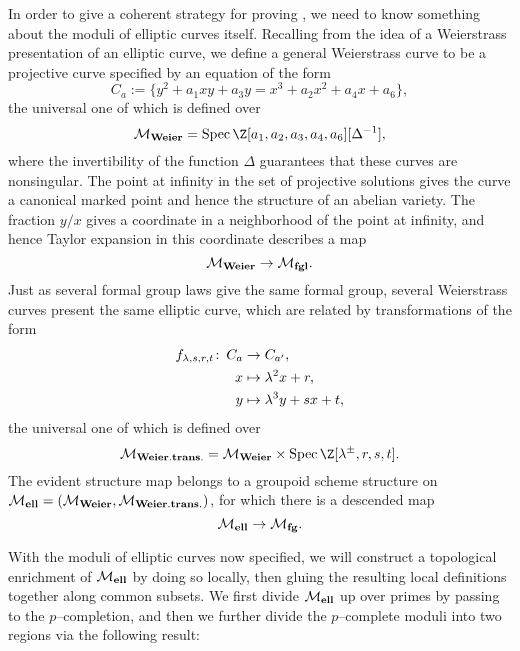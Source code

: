 In order to give a coherent strategy for proving , we need to know something about the moduli of elliptic curves itself.  Recalling from  the idea of a Weierstrass presentation of an elliptic curve, we define a general Weierstrass curve to be a projective curve specified by an equation of the form \[C_a := \{y^2 + a_1xy + a_3y = x^3 + a_2x^2 + a_4x + a_6\},\] the universal one of which is defined over \[\moduli{Weier} = \Spec \Z[a_1, a_2, a_3, a_4, a_6][\Delta^{-1}],\] where the invertibility of the function \(\Delta\) guarantees that these curves are nonsingular.  The point at infinity in the set of projective solutions gives the curve a canonical marked point and hence the structure of an abelian variety.  The fraction \(y/x\) gives a coordinate in a neighborhood of the point at infinity, and hence Taylor expansion in this coordinate describes a map \[\mathcal{M}_{\mathbf{Weier}} \to \mathcal{M}_{\mathbf{fgl}}.\]  Just as several formal group laws give the same formal group, several Weierstrass curves present the same elliptic curve, which are related by transformations of the form
\begin{align*}
f_{\lambda,s,r,t} \colon\thinspace C_a & \to C_{a'}, \\
x & \mapsto \lambda^2 x + r, \\
y & \mapsto \lambda^3 y + sx + t,
\end{align*}
the universal one of which is defined over \[\moduli{Weier.trans.} = \moduli{Weier} \times \Spec \Z[\lambda^{\pm}, r, s, t].\]  The evident structure map belongs to a groupoid scheme structure on \(\mathcal{M}_{\mathbf{ell}} = (\mathcal{M}_{\mathbf{Weier}}, \mathcal{M}_{\mathbf{Weier.trans.}})\), for which there is a descended map \[\mathcal{M}_{\mathbf{ell}} \to \mathcal{M}_{\mathbf{fg}}.\]

With the moduli of elliptic curves now specified, we will construct a topological enrichment of \(\mathcal{M}_{\mathbf{ell}}\) by doing so locally, then gluing the resulting local definitions together along common subsets.  We first divide \(\mathcal{M}_{\mathbf{ell}}\) up over primes by passing to the \(p\)--completion, and then we further divide the \(p\)--complete moduli into two regions via the following result:

